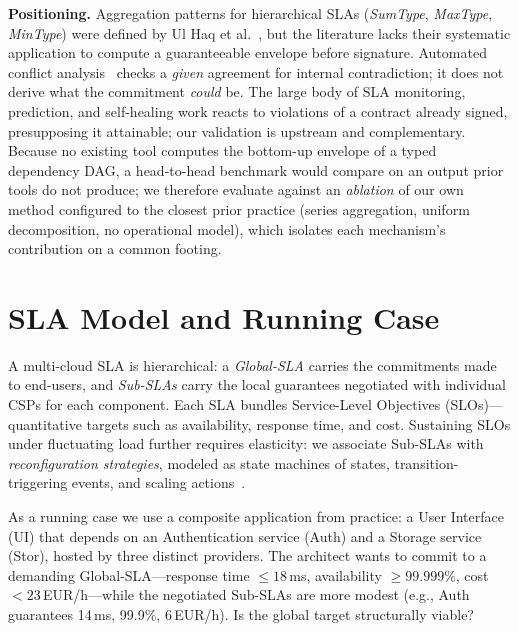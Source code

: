 \documentclass[conference]{IEEEtran}
\begin{document}
\textbf{Positioning.} Aggregation patterns for hierarchical SLAs (\textit{SumType}, \textit{MaxType}, \textit{MinType}) were defined by Ul Haq et al.~\cite{ulhaq2011composition}, but the literature lacks their systematic application to compute a guaranteeable envelope before signature. Automated conflict analysis~\cite{mueller2014consistency} checks a \emph{given} agreement for internal contradiction; it does not derive what the commitment \emph{could} be. The large body of SLA monitoring, prediction, and self-healing work reacts to violations of a contract already signed, presupposing it attainable; our validation is upstream and complementary. Because no existing tool computes the bottom-up envelope of a typed dependency DAG, a head-to-head benchmark would compare on an output prior tools do not produce; we therefore evaluate against an \emph{ablation} of our own method configured to the closest prior practice (series aggregation, uniform decomposition, no operational model), which isolates each mechanism's contribution on a common footing.

\section{SLA Model and Running Case}\label{sec:context}

A multi-cloud SLA is hierarchical: a \emph{Global-SLA} carries the commitments made to end-users, and \emph{Sub-SLAs} carry the local guarantees negotiated with individual CSPs for each component. Each SLA bundles Service-Level Objectives (SLOs)---quantitative targets such as availability, response time, and cost. Sustaining SLOs under fluctuating load further requires elasticity: we associate Sub-SLAs with \emph{reconfiguration strategies}, modeled as state machines of states, transition-triggering events, and scaling actions~\cite{mechouche2021reconfig}.

As a running case we use a composite application from practice: a User Interface (UI) that depends on an Authentication service (Auth) and a Storage service (Stor), hosted by three distinct providers. The architect wants to commit to a demanding Global-SLA---response time $\leq 18$\,ms, availability $\geq 99.999\%$, cost $< 23$\,EUR/h---while the negotiated Sub-SLAs are more modest (e.g., Auth guarantees 14\,ms, 99.9\%, 6\,EUR/h). Is the global target structurally viable?
\end{document}
